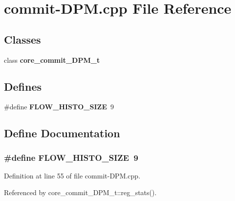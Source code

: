 \section{commit-DPM.cpp File Reference}
\label{commit-DPM_8cpp}
\subsection*{Classes}
\begin{CompactItemize}
\item 
class {\bf core\_\-commit\_\-DPM\_\-t}
\end{CompactItemize}
\subsection*{Defines}
\begin{CompactItemize}
\item 
\#define {\bf FLOW\_\-HISTO\_\-SIZE}~9
\end{CompactItemize}


\subsection{Define Documentation}
\subsubsection[{FLOW\_\-HISTO\_\-SIZE}]{\setlength{\rightskip}{0pt plus 5cm}\#define FLOW\_\-HISTO\_\-SIZE~9}\label{commit-DPM_8cpp_7e301e88bf620815320ee07e9bda6e62}




Definition at line 55 of file commit-DPM.cpp.

Referenced by core\_\-commit\_\-DPM\_\-t::reg\_\-stats().